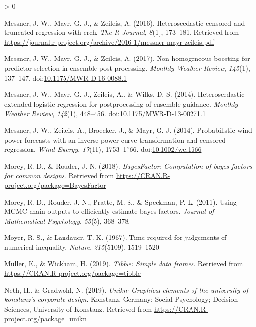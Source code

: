 \documentclass[
  english,
  doc,floatsintext]{apa6}
\newlength{\cslhangindent}
\newenvironment{CSLReferences}[2] %
 {%
  \setlength{\parindent}{0pt}
  \ifodd #1 \everypar{\setlength{\hangindent}{\cslhangindent}}\ignorespaces\fi
  \ifnum #2 > 0
  \setlength{\parskip}{#2\baselineskip}
  \fi
 }%
 {}
\begin{document}
\begin{CSLReferences}{1}{0}
\leavevmode\hypertarget{ref-R-crch_a}{}%
Messner, J. W., Mayr, G. J., \& Zeileis, A. (2016). Heteroscedastic censored and truncated regression with {crch}. \emph{The R Journal}, \emph{8}(1), 173--181. Retrieved from \url{https://journal.r-project.org/archive/2016-1/messner-mayr-zeileis.pdf}

\leavevmode\hypertarget{ref-R-crch_b}{}%
Messner, J. W., Mayr, G. J., \& Zeileis, A. (2017). Non-homogeneous boosting for predictor selection in ensemble post-processing. \emph{Monthly Weather Review}, \emph{145}(1), 137--147. doi:\href{https://doi.org/10.1175/MWR-D-16-0088.1}{10.1175/MWR-D-16-0088.1}

\leavevmode\hypertarget{ref-R-crch_d}{}%
Messner, J. W., Mayr, G. J., Zeileis, A., \& Wilks, D. S. (2014). Heteroscedastic extended logistic regression for postprocessing of ensemble guidance. \emph{Monthly Weather Review}, \emph{142}(1), 448--456. doi:\href{https://doi.org/10.1175/MWR-D-13-00271.1}{10.1175/MWR-D-13-00271.1}

\leavevmode\hypertarget{ref-R-crch_c}{}%
Messner, J. W., Zeileis, A., Broecker, J., \& Mayr, G. J. (2014). Probabilistic wind power forecasts with an inverse power curve transformation and censored regression. \emph{Wind Energy}, \emph{17}(11), 1753--1766. doi:\href{https://doi.org/10.1002/we.1666}{10.1002/we.1666}

\leavevmode\hypertarget{ref-R-BayesFactor}{}%
Morey, R. D., \& Rouder, J. N. (2018). \emph{BayesFactor: Computation of bayes factors for common designs}. Retrieved from \url{https://CRAN.R-project.org/package=BayesFactor}

\leavevmode\hypertarget{ref-morey2011using}{}%
Morey, R. D., Rouder, J. N., Pratte, M. S., \& Speckman, P. L. (2011). Using MCMC chain outputs to efficiently estimate bayes factors. \emph{Journal of Mathematical Psychology}, \emph{55}(5), 368--378.

\leavevmode\hypertarget{ref-moyer1967time}{}%
Moyer, R. S., \& Landauer, T. K. (1967). Time required for judgements of numerical inequality. \emph{Nature}, \emph{215}(5109), 1519--1520.

\leavevmode\hypertarget{ref-R-tibble}{}%
Müller, K., \& Wickham, H. (2019). \emph{Tibble: Simple data frames}. Retrieved from \url{https://CRAN.R-project.org/package=tibble}

\leavevmode\hypertarget{ref-R-unikn}{}%
Neth, H., \& Gradwohl, N. (2019). \emph{Unikn: Graphical elements of the university of konstanz's corporate design}. Konstanz, Germany: Social Psychology; Decision Sciences, University of Konstanz. Retrieved from \url{https://CRAN.R-project.org/package=unikn}


\end{CSLReferences}
\end{document}
